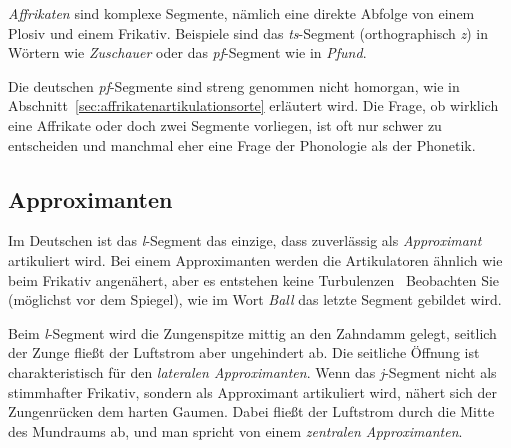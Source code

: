 \textit{Affrikaten} sind komplexe Segmente, nämlich eine direkte Abfolge von einem Plosiv und einem Frikativ.
Beispiele sind das \textit{ts}-Segment (orthographisch \textit{z}) in Wörtern wie \textit{Zuschauer} oder das \textit{pf}-Segment wie in \textit{Pfund}.


Die deutschen \textit{pf}-Segmente sind \zB streng genommen nicht homorgan, wie in Abschnitt~\ref{sec:affrikatenartikulationsorte} erläutert wird.
Die Frage, ob wirklich eine Affrikate oder doch zwei Segmente vorliegen, ist oft nur schwer zu entscheiden und manchmal eher eine Frage der Phonologie als der Phonetik.

\subsection{Approximanten}

\label{sec:lateraleapproximanten}

Im Deutschen ist das \textit{l}-Segment das einzige, dass zuverlässig als \textit{Approximant} artikuliert wird.
Bei einem Approximanten werden die Artikulatoren ähnlich wie beim Frikativ angenähert, aber es entstehen keine Turbulenzen
\TuBegin~Beobachten Sie (möglichst vor dem Spiegel), wie im Wort \textit{Ball} das letzte Segment gebildet wird.

Beim \textit{l}-Segment wird die Zungenspitze mittig an den Zahndamm gelegt, seitlich der Zunge fließt der Luftstrom aber ungehindert ab.
Die seitliche Öffnung ist charakteristisch für den \textit{lateralen Approximanten}.
Wenn das \textit{j}-Segment nicht als stimmhafter Frikativ, sondern als Approximant artikuliert wird, nähert sich der Zungenrücken dem harten Gaumen.
Dabei fließt der Luftstrom durch die Mitte des Mundraums ab, und man spricht von einem \textit{zentralen Approximanten}.


